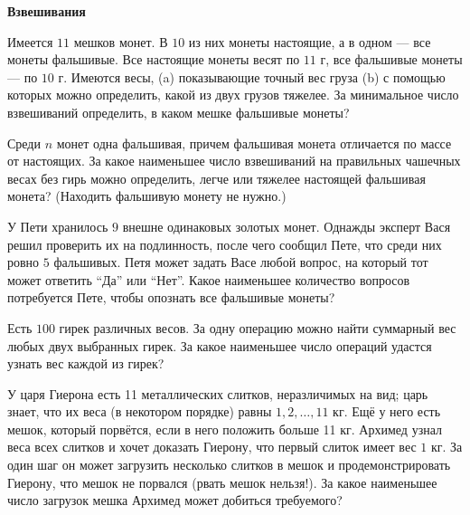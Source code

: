 \documentclass{article}
\begin{document}
    \large


    \begin{center}
        \textbf{Взвешивания}
    \end{center}

    \begin{enumerate_boxed}

        \item Имеется $11$ мешков монет.
        В $10$ из них монеты настоящие, а в одном — все монеты фальшивые.
        Все настоящие монеты весят по $11$ г, все фальшивые монеты — по $10$ г. Имеются весы, (a) показывающие точный вес груза (b) с помощью которых можно определить, какой из двух грузов тяжелее.
        За минимальное число взвешиваний определить, в каком мешке фальшивые монеты?

        \item Среди $n$ монет одна фальшивая, причем фальшивая монета отличается по массе от настоящих.
        За какое наименьшее число взвешиваний на правильных чашечных весах без гирь можно определить, легче или тяжелее настоящей фальшивая монета?
        (Находить фальшивую монету не нужно.)

        \item У Пети хранилось $9$ внешне одинаковых золотых монет.
        Однажды эксперт Вася решил проверить их на подлинность, после чего сообщил Пете, что среди них ровно $5$ фальшивых.
        Петя может задать Васе любой вопрос, на который тот может ответить “Да” или “Нет”.
        Какое наименьшее количество вопросов потребуется Пете, чтобы опознать все фальшивые монеты?

        \item Есть $100$ гирек различных весов.
        За одну операцию можно найти суммарный вес любых двух выбранных гирек.
        За какое наименьшее число
        операций удастся узнать вес каждой из гирек?

        \item У царя Гиерона есть 11 металлических слитков, неразличимых на вид; царь знает, что их веса (в некотором порядке) равны $1, 2, \ldots , 11$ кг.
        Ещё у него есть мешок, который порвётся, если в него положить больше 11 кг.
        Архимед узнал веса всех слитков и хочет доказать Гиерону, что первый слиток имеет вес $1$ кг.
        За один шаг он может загрузить несколько слитков в мешок и продемонстрировать Гиерону, что мешок не порвался (рвать мешок нельзя!).
        За какое наименьшее число загрузок мешка Архимед может добиться требуемого?


\end{enumerate_boxed}
\end{document}
